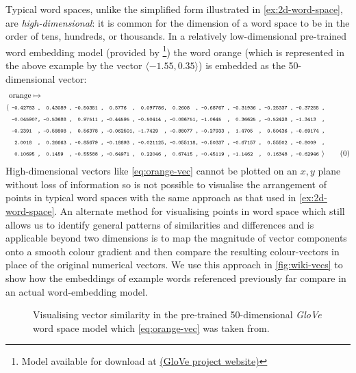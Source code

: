 \documentclass{ucetd}
\begin{document}
Typical word spaces, unlike the simplified form illustrated in \autoref{ex:2d-word-space}, are \emph{high-dimensional}: it is common for the dimension of a word space to be in the order of tens, hundreds, or thousands. In a relatively low-dimensional pre-trained word embedding model (provided by \textcite{pennington2014glove}\footnote{Model available for download at \href{https://nlp.stanford.edu/projects/glove/}{(GloVe project website)}}) the word orange (which is represented in the above example by the vector $\langle -1.55, 0.35\rangle$) is embedded as the 50-dimensional vector:
\begin{align*}
  &\text{orange}\mapsto\\
  \text{\small{$\langle$}}
  &\texttt{\scriptsize ~-0.42783~,~~0.43089~,~-0.50351~,~~0.5776~~,~~0.097786,~~0.2608~~,~-0.68767~,~-0.31936~,~-0.25337~,~-0.37255~,}\\
  &\texttt{\scriptsize ~-0.045907,~-0.53688~,~~0.97511~,~-0.44595~,~-0.50414~,~-0.086751,~-1.0645~~,~~0.36625~,~-0.52428~,~-1.3413~~,}\\
  &\texttt{\scriptsize ~-0.2391~~,~-0.58808~,~~0.56378~,~-0.062501,~-1.7429~~,~-0.88077~,~-0.27933~,~~1.4705~~,~~0.50436~,~-0.69174~,}\\
  &\texttt{\scriptsize ~~2.0018~~,~~0.26663~,~-0.85679~,~-0.18893~,~-0.021125,~-0.055118,~-0.50337~,~-0.67157~,~~0.55502~,~-0.8009~~,}\\
  &\texttt{\scriptsize ~~0.10695~,~~0.1459~~,~-0.55588~,~-0.64971~,~~0.22046~,~~0.67415~,~-0.45119~,~-1.1462~~,~~0.16348~,~-0.62946~}
  \text{\small{$\rangle$}}\tag{\theequation}\label{eq:orange-vec}
\end{align*}
High-dimensional vectors like \eqref{eq:orange-vec} cannot be plotted on an $x,y$ plane without loss of information so is not possible to visualise the arrangement of points in typical word spaces with the same approach as that used in \autoref{ex:2d-word-space}. An alternate method for visualising points in word space which still allows us to identify general patterns of similarities and differences and is applicable beyond two dimensions is to map the magnitude of vector components onto a smooth colour gradient and then compare the resulting colour-vectors in place of the original numerical vectors. We use this approach in \autoref{fig:wiki-vecs} to show how the embeddings of example words referenced previously far compare in an actual word-embedding model.
\begin{figure}[h]
  \captionsetup{width=.91\linewidth}
 \centering
 
 \caption{Visualising vector similarity in the pre-trained 50-dimensional \emph{GloVe} word space model which \eqref{eq:orange-vec} was taken from.}\label{fig:wiki-vecs}
 \centering
\end{figure}
\end{document}
